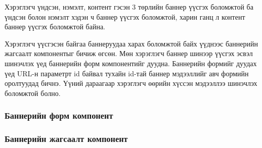 Хэрэглэгч үндсэн, нэмэлт, контент гэсэн 3 төрлийн баннер үүсгэх боломжтой ба үндсэн болон нэмэлт хэдэн ч баннер үүсгэх боломжтой, харин ганц л контент баннер үүсгэх боломжтой байна.

Хэрэглэгч үүсгэсэн байгаа баннеруудаа харах боломжтой байх үүднээс баннерийн жагсаалт компонентыг бичиж өгсөн. Мөн хэрэглэгч баннер шинээр үүсгэх эсвэл шинэчлэх үед баннерийн форм компонентийг дуудна. Баннерийн формийг дуудах үед URL-н параметрт id байвал тухайн id-тай баннер мэдээллийг авч формийн оролтуудад бичнэ. Үүний дараагаар хэрэглэгч өөрийн хүссэн мэдээллээ шинэчлэх боломжтой болно.
\subsubsection{Баннерийн форм компонент}

\subsubsection{Баннерийн жагсаалт компонент}


